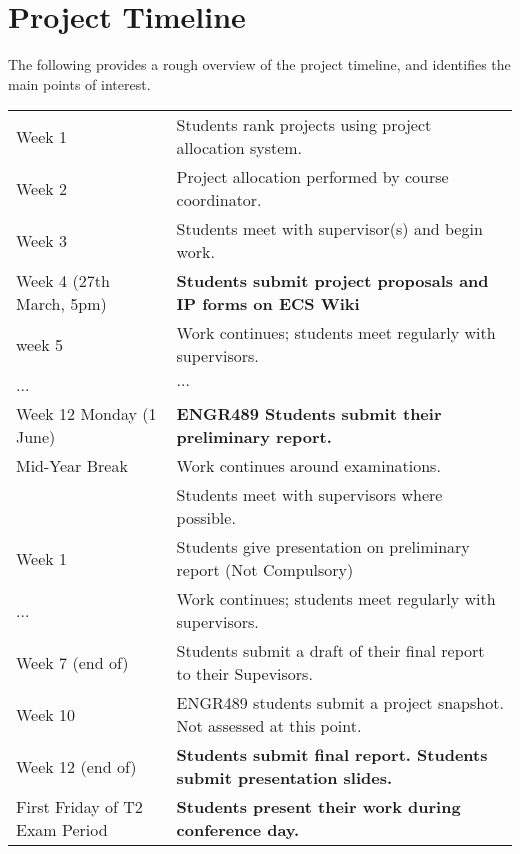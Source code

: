 \section{Project Timeline}
The following provides a rough overview of the project timeline, and identifies the main points of interest.
\begin{center}
\begin{tabular}{|l|l|}
\hline
Week 1 & {Students rank projects using project allocation system.}\\
Week 2 & Project allocation performed by course coordinator.\\
Week 3 & Students meet with supervisor(s) and begin work.\\
Week 4 (27th March, 5pm)& \textbf{{Students submit project proposals and IP forms on ECS Wiki}}\\
week 5 & Work continues; students meet regularly with supervisors.\\
...&  $\ldots$\\
Week 12 Monday (1 June)& \textbf{ENGR489 Students submit their preliminary report.}\\
\hline
\hline
Mid-Year Break& Work continues around examinations.\\
&Students meet with supervisors where possible.\\
\hline
\hline
Week 1 & {Students give presentation on preliminary report (Not Compulsory)}\\
...& Work continues; students meet regularly with supervisors.\\
Week 7 (end of)& {Students submit a draft of their final report to their Supevisors.}\\
Week 10 & {ENGR489 students submit a project snapshot. Not assessed at this point.}\\
Week 12 (end of)& \textbf{{Students submit final report.} {Students submit presentation slides.}}\\
\hline
\hline
First Friday of T2 Exam Period & \textbf{Students present their work during conference day.}\\
\hline
\end{tabular}
\end{center}
